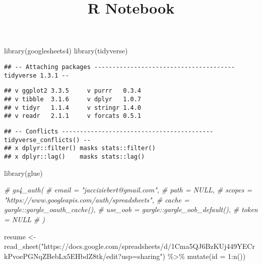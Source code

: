 \documentclass[
]{article}
\title{R Notebook}
\author{}
\date{\vspace{-2.5em}}
\newenvironment{Shaded}{\begin{snugshade}}{\end{snugshade}}
\newcommand{\AttributeTok}[1]{\textcolor[rgb]{0.77,0.63,0.00}{#1}}
\newcommand{\CommentTok}[1]{\textcolor[rgb]{0.56,0.35,0.01}{\textit{#1}}}
\newcommand{\DecValTok}[1]{\textcolor[rgb]{0.00,0.00,0.81}{#1}}
\newcommand{\FunctionTok}[1]{\textcolor[rgb]{0.00,0.00,0.00}{#1}}
\newcommand{\NormalTok}[1]{#1}
\newcommand{\OtherTok}[1]{\textcolor[rgb]{0.56,0.35,0.01}{#1}}
\newcommand{\SpecialCharTok}[1]{\textcolor[rgb]{0.00,0.00,0.00}{#1}}
\newcommand{\StringTok}[1]{\textcolor[rgb]{0.31,0.60,0.02}{#1}}
\begin{document}
\maketitle

\begin{Shaded}
\begin{Highlighting}[]
\FunctionTok{library}\NormalTok{(googlesheets4)}
\FunctionTok{library}\NormalTok{(tidyverse)}
\end{Highlighting}
\end{Shaded}

\begin{verbatim}
## -- Attaching packages --------------------------------------- tidyverse 1.3.1 --
\end{verbatim}

\begin{verbatim}
## v ggplot2 3.3.5     v purrr   0.3.4
## v tibble  3.1.6     v dplyr   1.0.7
## v tidyr   1.1.4     v stringr 1.4.0
## v readr   2.1.1     v forcats 0.5.1
\end{verbatim}

\begin{verbatim}
## -- Conflicts ------------------------------------------ tidyverse_conflicts() --
## x dplyr::filter() masks stats::filter()
## x dplyr::lag()    masks stats::lag()
\end{verbatim}

\begin{Shaded}
\begin{Highlighting}[]
\FunctionTok{library}\NormalTok{(glue)}
\end{Highlighting}
\end{Shaded}

\begin{Shaded}
\begin{Highlighting}[]
\CommentTok{\# gs4\_auth(}
\CommentTok{\# email = "jacciziebert@gmail.com",}
\CommentTok{\# path = NULL,}
\CommentTok{\# scopes = "https://www.googleapis.com/auth/spreadsheets",}
\CommentTok{\# cache = gargle::gargle\_oauth\_cache(),}
\CommentTok{\# use\_oob = gargle::gargle\_oob\_default(),}
\CommentTok{\# token = NULL}
\CommentTok{\# )}
\end{Highlighting}
\end{Shaded}

\begin{Shaded}
\begin{Highlighting}[]
\NormalTok{resume }\OtherTok{\textless{}{-}} \FunctionTok{read\_sheet}\NormalTok{(}\StringTok{"https://docs.google.com/spreadsheets/d/1Cma5QJ6BzKUj449YECrkPvoePGNqZBebLx5EHbdZ8tk/edit?usp=sharing"}\NormalTok{) }\SpecialCharTok{\%\textgreater{}\%} \FunctionTok{mutate}\NormalTok{(}\AttributeTok{id =} \DecValTok{1}\SpecialCharTok{:}\FunctionTok{n}\NormalTok{())}
\end{Highlighting}
\end{Shaded}
\end{document}
